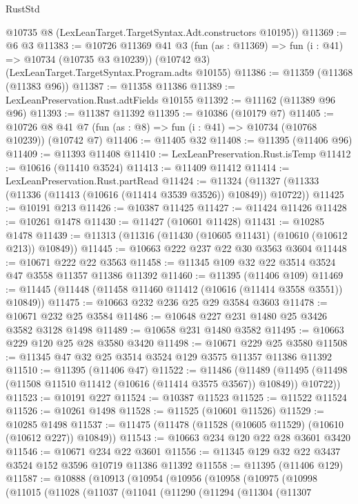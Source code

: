 \begin{lexlean}{RustStd}
\begin{coremodule}
    @10735 @8 (LexLeanTarget.TargetSyntax.Adt.constructors @10195))
@11369 := @6 @3
@11383 := @10726
    @11369
    @41
    @3
    (fun (as : @11369) => fun (i : @41) => @10734 (@10735 @3 @10239))
    (@10742 @3)
    (LexLeanTarget.TargetSyntax.Program.adts @10155)
@11386 := @11359 (@11368 (@11383 @96))
@11387 := @11358 @11386
@11389 := LexLeanPreservation.Rust.adtFields @10155
@11392 := @11162 (@11389 @96 @96)
@11393 := @11387 @11392
@11395 := @10386 (@10179 @7)
@11405 := @10726 @8 @41 @7 (fun (as : @8) => fun (i : @41) => @10734 (@10768 @10239)) (@10742 @7)
@11406 := @11405 @32
@11408 := @11395 (@11406 @96)
@11409 := @11393 @11408
@11410 := LexLeanPreservation.Rust.isTemp
@11412 := @10616 (@11410 @3524)
@11413 := @11409 @11412
@11414 := LexLeanPreservation.Rust.partRead
@11424 := @11324 (@11327 (@11333 (@11336 (@11413 (@10616 (@11414 @3539 @3526)) @10849)) @10722))
@11425 := @10191 @213
@11426 := @10387 @11425
@11427 := @11424 @11426
@11428 := @10261 @1478
@11430 := @11427 (@10601 @11428)
@11431 := @10285 @1478
@11439 := @11313 (@11316 (@11430 (@10605 @11431) (@10610 (@10612 @213)) @10849))
@11445 := @10663 @222 @237 @22 @30 @3563 @3604
@11448 := @10671 @222 @22 @3563
@11458 := @11345 @109 @32 @22 @3514 @3524 @47 @3558 @11357 @11386 @11392
@11460 := @11395 (@11406 @109)
@11469 := @11445 (@11448 (@11458 @11460 @11412 (@10616 (@11414 @3558 @3551)) @10849))
@11475 := @10663 @232 @236 @25 @29 @3584 @3603
@11478 := @10671 @232 @25 @3584
@11486 := @10648 @227 @231 @1480 @25 @3426 @3582 @3128 @1498
@11489 := @10658 @231 @1480 @3582
@11495 := @10663 @229 @120 @25 @28 @3580 @3420
@11498 := @10671 @229 @25 @3580
@11508 := @11345 @47 @32 @25 @3514 @3524 @129 @3575 @11357 @11386 @11392
@11510 := @11395 (@11406 @47)
@11522 := @11486
    (@11489 (@11495 (@11498 (@11508 @11510 @11412 (@10616 (@11414 @3575 @3567)) @10849)) @10722))
@11523 := @10191 @227
@11524 := @10387 @11523
@11525 := @11522 @11524
@11526 := @10261 @1498
@11528 := @11525 (@10601 @11526)
@11529 := @10285 @1498
@11537 := @11475 (@11478 (@11528 (@10605 @11529) (@10610 (@10612 @227)) @10849))
@11543 := @10663 @234 @120 @22 @28 @3601 @3420
@11546 := @10671 @234 @22 @3601
@11556 := @11345 @129 @32 @22 @3437 @3524 @152 @3596 @10719 @11386 @11392
@11558 := @11395 (@11406 @129)
@11587 := @10888
    (@10913
      (@10954
        (@10956
          (@10958
            (@10975
              (@10998
                (@11015
                  (@11028
                    (@11037
                      (@11041
                        (@11290
                          (@11294
                            (@11304
                              (@11307

\end{coremodule}
\end{lexlean}
